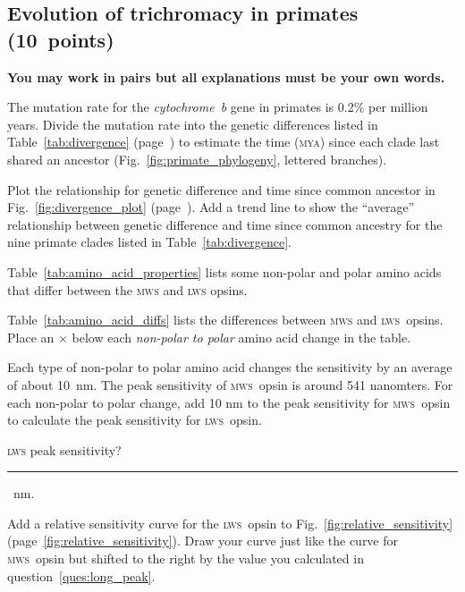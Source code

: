 \documentclass[12pt, addpoints]{exam}
\newcommand{\mws}{\textsc{mws}}
\newcommand{\lws}{\textsc{lws}}
\begin{document}
\subsection*{Evolution of trichromacy in primates (10~points)}

\textbf{You may work in pairs but all explanations must be your own words.}

\begin{questions}

\begin{multicols}{2}

\question
The mutation rate for the \textit{cytochrome~b} gene in primates is 0.2\% per million years. %
Divide the mutation rate into the genetic differences listed in Table~\ref{tab:divergence} (page~\pageref{tab:divergence}) to estimate the time (\textsc{mya}) since each clade last shared an ancestor (Fig.~\ref{fig:primate_phylogeny}, lettered branches). 

\bigskip


\question
Plot the relationship for genetic difference and time since common ancestor in Fig.~\ref{fig:divergence_plot} (page~\pageref{tab:divergence}). Add a trend line to show the “average” relationship between genetic difference and time since common ancestry for the nine primate clades listed in Table~\ref{tab:divergence}.

\bigskip

\question
Table~\ref{tab:amino_acid_properties} lists some non-polar and polar amino acids that differ between the \mws{} and \lws{} opsins. 

Table~\ref{tab:amino_acid_diffs} lists the differences between \mws{} and \lws{}~opsins. Place an {\large $\times$} below each \textit{non-polar to polar} amino acid change in the table.

\bigskip

\question\label{ques:long_peak}
Each type of non-polar to polar amino acid changes the sensitivity by an average of about 10~nm. The peak sensitivity of \mws{}~opsin is around 541 nanomters. For each non-polar to polar change, add 10 nm to the peak sensitivity for \mws{}~opsin to calculate the peak sensitivity for \lws{}~opsin.

\medskip

\lws{} peak sensitivity? \rule{1in}{0.4pt}~nm.

\question
Add a relative sensitivity curve for the \lws{}~opsin to Fig.~\ref{fig:relative_sensitivity} (page~\ref{fig:relative_sensitivity}). Draw your curve just like the curve for \mws{}~opsin but shifted to the right by the value you calculated in question~\ref{ques:long_peak}.


\end{multicols}
\end{questions}
\end{document}
